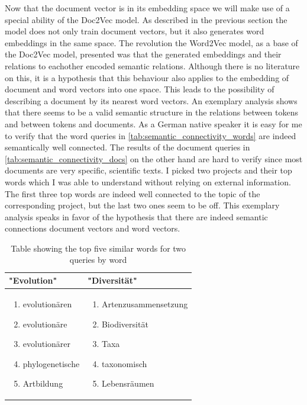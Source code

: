 Now that the document vector is in its embedding space we will make use of a special ability of the Doc2Vec model. As described in the previous section the model does not only train document vectors, but it also generates word embeddings in the same space. The revolution the Word2Vec model, as a base of the Doc2Vec model, presented was that the generated embeddings and their relations to eachother encoded semantic relations. Although there is no literature on this, it is a hypothesis that this behaviour also applies to the embedding of document and word vectors into one space. This leads to the possibility of describing a document by its nearest word vectors. An exemplary analysis shows that there seems to be a valid semantic structure in the relations between tokens and between tokens and documents. As a German native speaker it is easy for me to verify that the word queries in \autoref{tab:semantic_connectivity_words} are indeed semantically well connected. The results of the document queries in \autoref{tab:semantic_connectivity_docs} on the other hand are hard to verify since most documents are very specific, scientific texts. I picked two projects and their top words which I was able to understand without relying on external information. The first three top words are indeed well connected to the topic of the corresponding project, but the last two ones seem to be off. This exemplary analysis speaks in favor of the hypothesis that there are indeed semantic connections document vectors and word vectors.

\begin{table}
	\centering
	\begin{tabular}{ p{6cm} | p{6cm} }
		"Evolution" & "Diversität" \\ \hline
		\begin{enumerate}
			\item evolutionären
			\item evolutionäre
			\item evolutionärer
			\item phylogenetische
			\item Artbildung
		\end{enumerate} & 
		\begin{enumerate}
			\item Artenzusammensetzung
			\item Biodiversität
			\item Taxa
			\item taxonomisch
			\item Lebensräumen
		\end{enumerate} \\
	\end{tabular}
	\caption{\label{tab:semantic_connectivity_words} Table showing the top five similar words for two queries by word}
\end{table}

